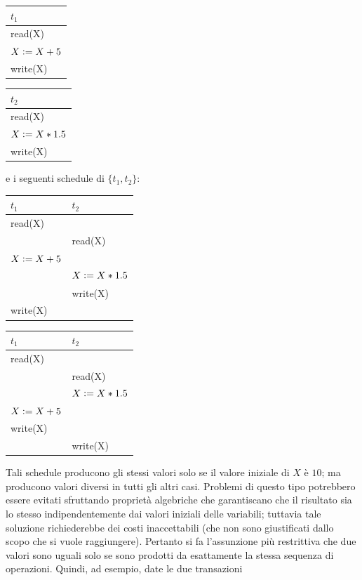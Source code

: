 \begin{multicols}{2}  
 \begin{tabular}{|l|}
   \hline
   $t_1$\\
   \hline
   read(X)\\ 
   $X\vcentcolon=X+5$\\ 
   write(X)\\ 
   \hline
  \end{tabular}

  \begin{tabular}{|l|}
  \hline
   $t_2$\\
   \hline
   read(X)\\ 
   $X\vcentcolon=X*1.5$\\ 
   write(X)\\
   \hline
  \end{tabular}

 \end{multicols}

 e i seguenti schedule di $\{t_1,t_2\}$:
\begin{multicols}{2}  
 \begin{tabular}{|l|l|}
 \hline
 $t_1$ & $t_2$\\
 \hline
   read(X) & \\
   & read(X)\\
   $X\vcentcolon=X+5$ & \\ 
   & $X\vcentcolon=X*1.5$\\
   & write(X)\\ 
   write(X) &\\ 
   \hline
  \end{tabular}

  \begin{tabular}{|l|l|}
   \hline
   $t_1$ & $t_2$\\
   \hline
   read(X) & \\
   & read(X)\\
   & $X\vcentcolon=X*1.5$\\
   $X\vcentcolon=X+5$ & \\ 
   write(X) &\\   
   & write(X)\\
   \hline
  \end{tabular}
 \end{multicols}
 
Tali schedule producono gli stessi valori solo se il valore iniziale di $X$ è $10$; ma producono valori
diversi in tutti gli altri casi. Problemi di questo tipo potrebbero essere evitati sfruttando proprietà
algebriche che garantiscano che il risultato sia lo stesso indipendentemente dai valori iniziali delle
variabili; tuttavia tale soluzione richiederebbe dei costi inaccettabili (che non sono giustificati dallo
scopo che si vuole raggiungere). Pertanto si fa l'assunzione più restrittiva che due valori sono
uguali solo se sono prodotti da esattamente la stessa sequenza di operazioni. Quindi, ad esempio,
date le due transazioni

